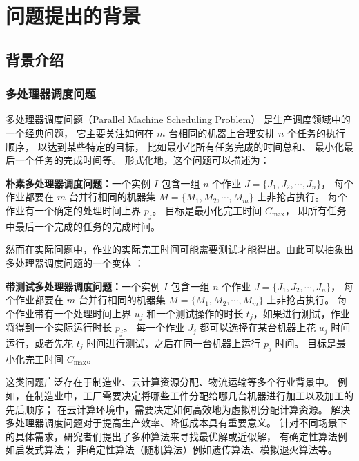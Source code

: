 \section{问题提出的背景}


\subsection{背景介绍}

\subsubsection{多处理器调度问题}

多处理器调度问题（Parallel Machine Scheduling Problem）\cite{gary1979computers}
是生产调度领域中的一个经典问题，
它主要关注如何在 $m$ 台相同的机器上合理安排 $n$ 个任务的执行顺序，
以达到某些特定的目标，
比如最小化所有任务完成的时间总和、
最小化最后一个任务的完成时间等。
形式化地，这个问题可以描述为：

\begin{defi}
    \textbf{朴素多处理器调度问题：}一个实例 $I$ 包含一组 $n$ 个作业 $J = \{J_1, J_2, \cdots, J_n\}$，
    每个作业都要在 $m$ 台并行相同的机器集 $M = \{M_1, M_2, \cdots, M_m\}$ 上非抢占执行。
    每个作业有一个确定的处理时间上界 $p_j$。
    目标是最小化完工时间 $C_{\text{max}}$，
    即所有任务中最后一个完成的任务的完成时间。
\end{defi}

然而在实际问题中，作业的实际完工时间可能需要测试才能得出。由此可以抽象出多处理器调度问题的一个变体
\cite{durr2018scheduling}\cite{durr2020adversarial}\cite{albers2021scheduling}：

\begin{defi}
    \textbf{带测试多处理器调度问题：}一个实例 $I$ 包含一组 $n$ 个作业 $J = \{J_1, J_2, \cdots, J_n\}$，
    每个作业都要在 $m$ 台并行相同的机器集 $M = \{M_1, M_2, \cdots, M_m\}$ 上非抢占执行。
    每个作业带有一个处理时间上界 $u_j$ 和一个测试操作的时长 $t_j$，如果进行测试，作业将得到一个实际运行时长 $p_j$。
    每一个作业 $J_j$ 都可以选择在某台机器上花 $u_j$ 时间运行，或者先花 $t_j$ 时间进行测试，之后在同一台机器上运行 $p_j$ 时间。
    目标是最小化完工时间 $C_{\text{max}}$。
\end{defi}

这类问题广泛存在于制造业、云计算资源分配、物流运输等多个行业背景中。
例如，在制造业中，工厂需要决定将哪些工件分配给哪几台机器进行加工以及加工的先后顺序；
在云计算环境中，需要决定如何高效地为虚拟机分配计算资源。
解决多处理器调度问题对于提高生产效率、降低成本具有重要意义。
针对不同场景下的具体需求，研究者们提出了多种算法来寻找最优解或近似解，
有确定性算法例如启发式算法；
非确定性算法（随机算法）例如遗传算法、模拟退火算法等。

